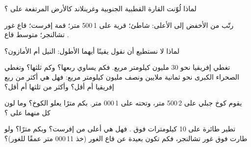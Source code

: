\begin{exercise}[$\star$]\label{exo:g4:world-physical-map:6}
لماذا لُوّنت القارة القطبية الجنوبية وغرينلاند كالأرض المرتفعة على ؟
\end{exercise}

\begin{exercise}[$\star\star$]\label{exo:g4:world-physical-map:7}
رتّب من الأخفض إلى الأعلى: شاطئ؛ قرية على 
1\,500 متر؛ قمة  إفرست؛ قاع غور
تشالنجر؛ متوسط قاع .
\end{exercise}

\begin{exercise}[$\star\star$]\label{exo:g4:world-physical-map:8}
لماذا لا نستطيع أن نقول يقينًا أيهما الأطول: النيل أم
الأمازون؟
\end{exercise}

\begin{exercise}[$\star\star$]\label{exo:g4:world-physical-map:9}
تغطي إفريقيا نحو 30 مليون كيلومتر مربع. فكم يساوي ربعها؟ وكم ثلثها؟
وتغطي الصحراء الكبرى نحو ثمانية ملايين ونصف مليون كيلومتر
مربع: فهل هي أكثر من ربع إفريقيا أم أقل؟ وأكثر من
ثلثها أم أقل؟
\end{exercise}

\begin{exercise}[$\star\star$]\label{exo:g4:world-physical-map:10}
يقوم كوخ جبلي على  2\,500 متر، وتحته  على  1\,000
متر. بكم مترًا يعلو الكوخ؟ وما لون كل منهما على
؟
\end{exercise}

\begin{exercise}[$\star\star\star$]\label{exo:g4:world-physical-map:11}
تطير طائرة على  10 كيلومترات فوق . فهل هي أعلى من 
إفرست؟ وبكم مترًا؟ ولو طارت فوق غور تشالنجر، فكم تكون بعيدة
عن قاع الغور (خذ 11\,000 متر عمقًا
للغور)؟
\end{exercise}
